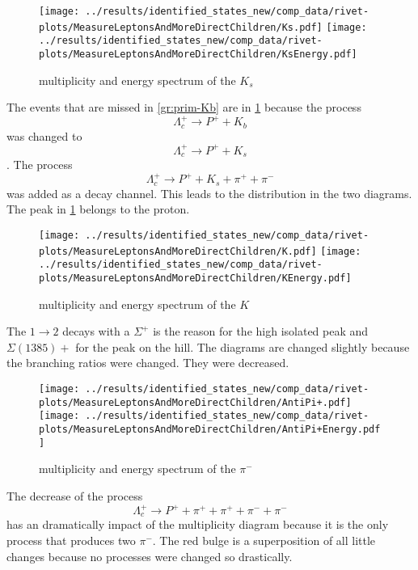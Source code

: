 \begin{figure}[h]
  \centering
  \texttt{[image: ../results/identified\_states\_new/comp\_data/rivet-plots/MeasureLeptonsAndMoreDirectChildren/Ks.pdf]}
  \texttt{[image: ../results/identified\_states\_new/comp\_data/rivet-plots/MeasureLeptonsAndMoreDirectChildren/KsEnergy.pdf]}
  \caption{multiplicity and energy spectrum of the \(K_s\)} \label{gr:prim-Ks}
\end{figure}
The events that are missed in {\ref{gr:prim-Kb}} are in {\ref{gr:prim-Ks}}
because the process
\begin{equation}
  \Lambda_c^+ \rightarrow P^+ + K_b \nonumber
\end{equation}
was changed to 
\begin{equation}
  \Lambda_c^+ \rightarrow P^+ + K_s \nonumber
\end{equation}.
The process
\begin{equation}
  \Lambda_c^+ \rightarrow P^+ + K_s + \pi^+ + \pi^- \nonumber
\end{equation}
was added as a decay channel. This leads to the distribution in the two diagrams. 
The peak in {\ref{gr:prim-Ks}} belongs to the proton.
\begin{figure}[h]
  \centering
  \texttt{[image: ../results/identified\_states\_new/comp\_data/rivet-plots/MeasureLeptonsAndMoreDirectChildren/K.pdf]}
  \texttt{[image: ../results/identified\_states\_new/comp\_data/rivet-plots/MeasureLeptonsAndMoreDirectChildren/KEnergy.pdf]}
  \caption{multiplicity and energy spectrum of the \(K\)} 
\end{figure}
The \( 1 \rightarrow 2 \) decays with a \(\Sigma^+\) is the reason for the high 
isolated peak and \(\Sigma(1385)+\) for the peak on the hill. The diagrams are 
changed slightly  because the branching ratios were changed. They were decreased.
\begin{figure}[h]
  \centering
  \texttt{[image: ../results/identified\_states\_new/comp\_data/rivet-plots/MeasureLeptonsAndMoreDirectChildren/AntiPi+.pdf]}
  \texttt{[image: ../results/identified\_states\_new/comp\_data/rivet-plots/MeasureLeptonsAndMoreDirectChildren/AntiPi+Energy.pdf]}
  \caption{multiplicity and energy spectrum of the \(\pi^-\)} \label{gr:prim-pi}
\end{figure}
The decrease of the process
\begin{equation}
  \Lambda_c^+ \rightarrow P^+ + \pi^+ + \pi^+ + \pi^- + \pi^- \nonumber
\end{equation}
has an dramatically impact of the multiplicity diagram because it is the only process 
that produces two \(\pi^-\). The red bulge is a superposition of all little changes 
because no processes were changed so drastically.


